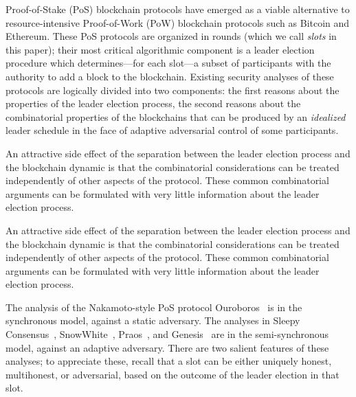 Proof-of-Stake (PoS) blockchain protocols have emerged as a viable
alternative to resource-intensive Proof-of-Work (PoW) blockchain
protocols such as Bitcoin and Ethereum. These PoS protocols are
organized in rounds (which we call \emph{slots} in this paper); their
most critical algorithmic component is a leader election procedure
which determines---for each slot---a subset of participants with the
authority to add a block to the blockchain. Existing security analyses
of these protocols are logically divided into two components: the
first reasons about the properties of the leader election process, the
second reasons about the combinatorial properties of the blockchains
that can be produced by an \emph{idealized} leader schedule in the
face of adaptive adversarial control of some participants. 


An
attractive side effect of 
the separation between the leader election process 
and the blockchain dynamic 
is that the combinatorial
considerations can be treated independently of other aspects of the
protocol. 
These common combinatorial arguments can be formulated with very
little information about the leader election process. 





An
attractive side effect of 
the separation between the leader election process 
and the blockchain dynamic 
is that the combinatorial
considerations can be treated independently of other aspects of the
protocol. 
These common combinatorial arguments can be formulated with very
little information about the leader election process. 


The analysis of the Nakamoto-style PoS protocol Ouroboros~\cite{Ouroboros} 
is in the synchronous model, against a static adversary. 
The analyses in Sleepy Consensus~\cite{Sleepy}, SnowWhite~\cite{SnowWhite}, 
Praos~\cite{Praos}, and Genesis~\cite{Genesis} are 
in the semi-synchronous model, against an adaptive adversary. 
There are two salient features of these analyses; 
to appreciate these, recall that 
a slot can be either uniquely honest, multihonest, or adversarial, 
based on the outcome of the leader election in that slot.

